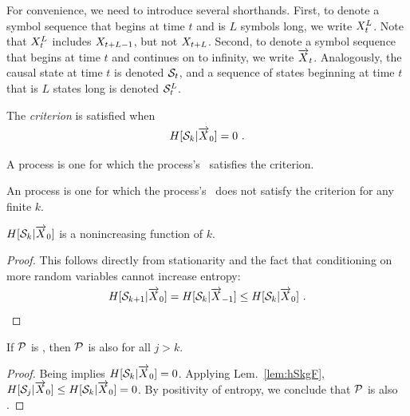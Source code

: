 For convenience, we need to introduce several shorthands. First, to denote a
symbol sequence that begins at time $t$ and is $L$ symbols long, we write
${X}_t^L$. Note that ${X}_t^L$ includes ${X}_{t+L-1}$,
but not ${X}_{t+L}$. Second, to denote a symbol sequence that begins at
time $t$ and continues on to infinity, we write $\smash{\overrightarrow{{X}}}_t$.  Analogously, the
causal state at time $t$ is denoted $\mathcal{S}_t$, and a sequence of states
beginning at time $t$ that is $L$ states long is denoted $\mathcal{S}_t^L$.

\begin{Def}
The \emph{ criterion} is satisfied when
\begin{align}
H[\mathcal{S}_k | \smash{\overrightarrow{{X}}}_0] = 0 ~.
\label{Def:OrderKCrypticityCriterion}
\end{align}
\end{Def}

\begin{Def}
A \emph{} process is one for which the process's \eM\ satisfies
the  criterion.
\end{Def}

\begin{Def}
An \emph{\cryptic{\infty}} process is one for which the process's \eM\ does
not satisfy the  criterion for any finite $k$.
\end{Def}

\begin{Lem}
\label{lem:hSkgF}
$H[\mathcal{S}_k | \smash{\overrightarrow{{X}}}_0]$ is a nonincreasing function of $k$.
\end{Lem}

\begin{proof}
This follows directly from stationarity and the fact that
conditioning on more random variables cannot increase entropy:
\begin{align*}
H[\mathcal{S}_{k+1} | \smash{\overrightarrow{{X}}}_0]
    = H[\mathcal{S}_k | \smash{\overrightarrow{{X}}}_{-1}]
    \leq H[\mathcal{S}_k | \smash{\overrightarrow{{X}}}_0] ~.
\end{align*}
\end{proof}

\begin{Lem}
If $\mathcal{P}$ is ,
then $\mathcal{P}$ is also  for all $j > k$.
\label{lem:OKCOJC}
\end{Lem}

\begin{proof}
Being  implies $H[\mathcal{S}_k | \smash{\overrightarrow{{X}}}_0] = 0$.
Applying Lem.~\ref{lem:hSkgF},
$H[\mathcal{S}_j | \smash{\overrightarrow{{X}}}_0] \le H[\mathcal{S}_k | \smash{\overrightarrow{{X}}}_0] = 0$.
By positivity of entropy, we conclude that $\mathcal{P}$ is also .
\end{proof} 

